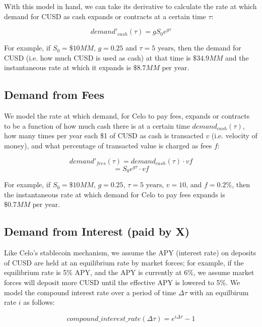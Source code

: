 With this model in hand, we can take its derivative to calculate the rate at which demand for CUSD as cash expands or contracts at a certain time $\tau$:

\begin{equation}
    demand'_{cash}(\tau) = gS_0e^{g\tau}
\end{equation}

For example, if $S_0=\$10MM$, $g=0.25$ and $\tau=5\textrm{ years}$, then the demand for CUSD (i.e. how much CUSD is used as cash) at that time is $\$34.9MM$ and the 
instantaneous rate at which it expands is $\$8.7MM\textrm{ per year}$.

\subsection{Demand from Fees}

We model the rate at which demand, for Celo to pay fees, expands or contracts to be a function of how much cash there is at a certain time $demand_{cash}(\tau)$,
how many times per year each \$1 of CUSD as cash is transacted $v$ (i.e. velocity of money), and what percentage of transacted value is charged as fees $f$:

\begin{equation}
    demand'_{fees}(\tau) = demand_{cash}(\tau)\cdot vf
\end{equation}
\begin{equation}
    = S_0e^{g\tau}\cdot vf
\end{equation}

For example, if $S_0=\$10MM$, $g=0.25$, $\tau=5\textrm{ years}$, $v=10$, and $f=0.2\%$, then the instantaneous rate at which demand for Celo to pay fees expands is $\$0.7MM\textrm{ per year}$.

\subsection{Demand from Interest (paid by X)}

Like Celo's stablecoin mechanism, we assume the APY (interest rate) on deposits of CUSD are held at an equilibrium rate by market forces; for example, if the equilibrium rate is 5\% APY, 
and the APY is currently at 6\%, we assume market forces will deposit more CUSD until the effective APY is lowered to 5\%. We model the compound interest rate over a period of time $\Delta\tau$
with an equilbirum rate $i$ as follows:

\begin{equation}
    compound\_interest\_rate(\Delta\tau) = e^{i\Delta\tau} - 1
\end{equation}

